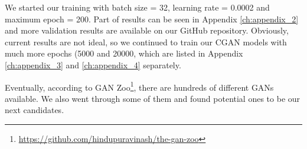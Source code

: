 We started our training with batch size = 32, learning rate = 0.0002 and maximum epoch = 200. Part of results can be seen in Appendix \ref{ch:appendix_2} and more validation results are available on our GitHub repository. Obviously, current results are not ideal, so we continued to train our CGAN models with much more epochs (5000 and 20000, which are listed in Appendix \ref{ch:appendix_3} and \ref{ch:appendix_4} separately.

Eventually, according to GAN Zoo\footnote{\url{https://github.com/hindupuravinash/the-gan-zoo}}, there are hundreds of different GANs available. We also went through some of them and found potential ones to be our next candidates.